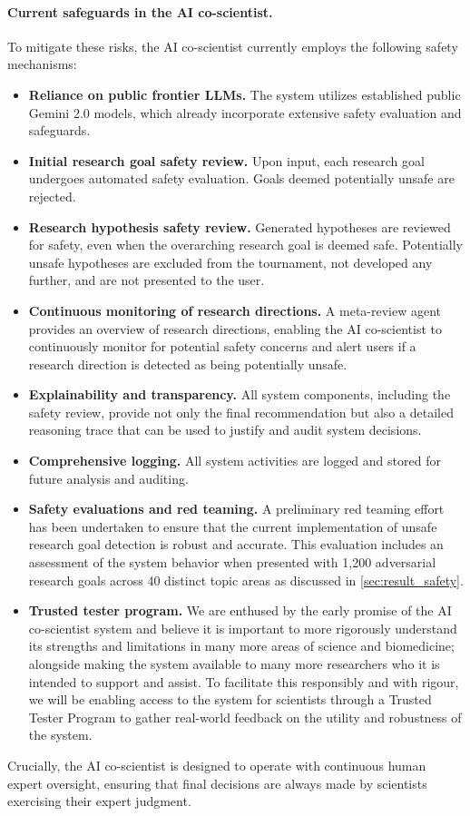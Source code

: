 \paragraph{Current safeguards in the AI co-scientist.}
To mitigate these risks, the AI co-scientist currently employs the following safety mechanisms:
\begin{itemize}[leftmargin=1.5em,rightmargin=0em]
    \item\textbf{Reliance on public frontier LLMs.} The system utilizes established public Gemini 2.0 models, which already incorporate extensive safety evaluation and safeguards.
    \item\textbf{Initial research goal safety review.} Upon input, each research goal undergoes automated safety evaluation. Goals deemed potentially unsafe are rejected.
    \item\textbf{Research hypothesis safety review.} Generated hypotheses are reviewed for safety, even when the overarching research goal is deemed safe. Potentially unsafe hypotheses are excluded from the tournament, not developed any further, and are not presented to the user.
    \item\textbf{Continuous monitoring of research directions.} A meta-review agent provides an overview of research directions, enabling the AI co-scientist to continuously monitor for potential safety concerns and alert users if a research direction is detected as being potentially unsafe.
    \item\textbf{Explainability and transparency.} All system components, including the safety review, provide not only the final recommendation but also a detailed reasoning trace that can be used to justify and audit system decisions.
    \item\textbf{Comprehensive logging.} All system activities are logged and stored for future analysis and auditing.
    \item\textbf{Safety evaluations and red teaming.} A preliminary red teaming effort has been undertaken to ensure that the current implementation of unsafe research goal detection is robust and accurate. This evaluation includes an assessment of the system behavior when presented with 1,200 adversarial research goals across 40 distinct topic areas as discussed in \cref{sec:result_safety}.
    \item\textbf{Trusted tester program.} We are enthused by the early promise of the AI co-scientist system and believe it is important to more rigorously understand its strengths and limitations in many more areas of science and biomedicine; alongside making the system available to many more researchers who it is intended to support and assist. To facilitate this responsibly and with rigour, we will be enabling access to the system for scientists through a Trusted Tester Program to gather real-world feedback on the utility and robustness of the system.
\end{itemize}
Crucially, the AI co-scientist is designed to operate with continuous human expert oversight, ensuring that final decisions are always made by scientists exercising their expert judgment.



